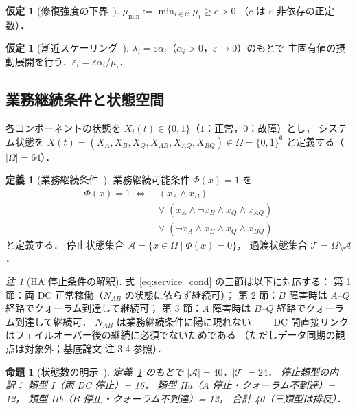 \documentclass[12pt,a4paper]{article}
\theoremstyle{plain}
\newtheorem{proposition}[theorem]{命題}
\theoremstyle{definition}
\newtheorem{definition}[theorem]{定義}
\newtheorem{assumption}[theorem]{仮定}
\theoremstyle{remark}
\newtheorem{remark}[theorem]{注}
\newcommand{\calA}{\mathcal{A}}        %
\newcommand{\calT}{\mathcal{T}}        %
\newcommand{\calC}{\mathcal{C}}        %
\newcommand{\eps}{\varepsilon}         %
\begin{document}
\begin{assumption}[修復強度の下界~{\cite{habase:v7}}]\label{ass:mumin}
  $\mu_{\min} := \min_{i\in\calC}\mu_i \ge c > 0$
  （$c$ は $\eps$ 非依存の正定数）．
\end{assumption}

\begin{assumption}[漸近スケーリング~{\cite{habase:v7}}]\label{ass:asym}
  $\lambda_i = \eps\alpha_i$（$\alpha_i > 0$，$\eps \to 0$）のもとで
  主固有値の摂動展開を行う．$\eps_i = \eps\alpha_i/\mu_i$．
\end{assumption}

\subsection{業務継続条件と状態空間}

各コンポーネントの状態を $X_i(t)\in\{0,1\}$（$1$：正常，$0$：故障）とし，
システム状態を $X(t)=(X_A,X_B,X_Q,X_{AB},X_{AQ},X_{BQ})\in\Omega=\{0,1\}^6$
と定義する（$|\Omega|=64$）．

\begin{definition}[業務継続条件~{\cite{habase:v7}}]\label{def:service}
  業務継続可能条件 $\Phi(x)=1$ を
  \begin{align}
    \Phi(x) = 1
    \;\iff\;
    &(x_A \land x_B) \nonumber\\
    &\lor\; (x_A \land \lnot x_B \land x_Q \land x_{AQ}) \nonumber\\
    &\lor\; (\lnot x_A \land x_B \land x_Q \land x_{BQ})
    \label{eq:service_cond}
  \end{align}
  と定義する．
  停止状態集合 $\calA = \{x\in\Omega \mid \Phi(x)=0\}$，
  過渡状態集合 $\calT = \Omega\setminus\calA$．
\end{definition}

\begin{remark}[HA 停止条件の解釈]
  式~\eqref{eq:service_cond} の三節は以下に対応する：
  第 1 節：両 DC 正常稼働（$N_{AB}$ の状態に依らず継続可）；
  第 2 節：$B$ 障害時は $A$–$Q$ 経路でクォーラム到達して継続可；
  第 3 節：$A$ 障害時は $B$–$Q$ 経路でクォーラム到達して継続可．
  $N_{AB}$ は業務継続条件に陽に現れない——
  DC 間直接リンクはフェイルオーバー後の継続に必須でないためである
  （ただしデータ同期の観点は対象外；基底論文 注 3.4 参照）．
\end{remark}

\begin{proposition}[状態数の明示~{\cite{habase:v7}}]\label{prop:states}
  定義~\ref{def:service} のもとで $|\calA|=40$，$|\calT|=24$．
  停止類型の内訳：
  類型 I（両 DC 停止）= 16，
  類型 IIa（$A$ 停止・クォーラム不到達）= 12，
  類型 IIb（$B$ 停止・クォーラム不到達）= 12，
  合計 40（三類型は排反）．
\end{proposition}
\end{document}
